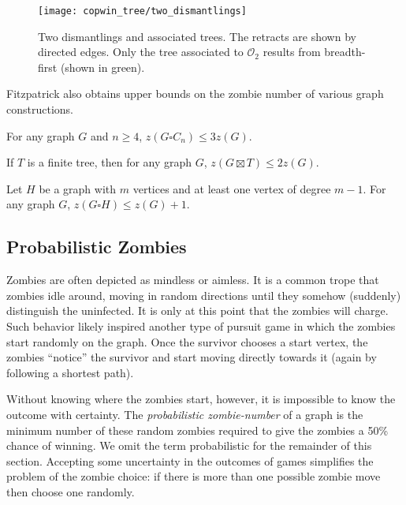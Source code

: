 \begin{figure}
\centering
\texttt{[image: copwin\_tree/two\_dismantlings]}
\caption{Two dismantlings and associated trees. The retracts are shown by directed edges. Only the tree associated to $\mathcal{O}_2$ results from breadth-first (shown in green). \label{fig:two_dismantlings}}
\end{figure}

Fitzpatrick also obtains upper bounds on the zombie number of various graph constructions.
\begin{theorem}
For any graph $G$ and $n \geq 4$, $z ( G \square C_n ) \leq 3 z ( G )$.
\end{theorem}

\begin{theorem}
If $T$ is a finite tree, then for any graph $G$, $z ( G \boxtimes T ) \leq 2 z ( G )$.
\end{theorem}

\begin{theorem}
Let $H$ be a graph with $m$ vertices and at least one vertex of degree $m - 1$. For any graph $G$, $z ( G \square H ) \leq z ( G ) + 1$.
\end{theorem}


\subsection{Probabilistic Zombies}\label{subsection intro probabilistic}

Zombies are often depicted as mindless or aimless. It is a common trope that zombies
idle around, moving in random directions until they somehow (suddenly) distinguish
the uninfected. It is only at this point that the zombies will charge.
Such behavior likely inspired another type of pursuit game \cite{bonato2016probabilistic} in which the zombies start randomly on the graph. Once the survivor chooses a start vertex, the zombies ``notice'' the survivor and start moving directly towards it (again by following a shortest path).

Without knowing where the zombies start, however, it is impossible to know the outcome with certainty.
The \textit{probabilistic zombie-number} of a graph is the minimum number of these random zombies required to give the zombies a 50\% chance of winning. We omit the term probabilistic for the remainder of this section. Accepting some uncertainty in the outcomes of games simplifies the problem of the zombie choice: if there is more than one possible zombie move then choose one randomly.

